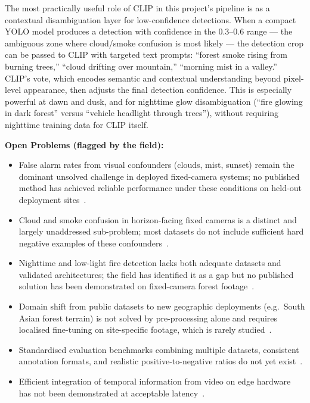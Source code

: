 \documentclass[11pt,twocolumn]{article}
\begin{document}
The most practically useful role of CLIP in this project's pipeline
is as a contextual disambiguation layer for low-confidence detections.
When a compact YOLO model produces a detection with confidence in the
0.3--0.6 range --- the ambiguous zone where cloud/smoke confusion is
most likely --- the detection crop can be passed to CLIP with targeted
text prompts: ``forest smoke rising from burning trees,''
``cloud drifting over mountain,'' ``morning mist in a valley.''
CLIP's vote, which encodes semantic and contextual understanding
beyond pixel-level appearance, then adjusts the final detection
confidence. This is especially powerful at dawn and dusk, and for
nighttime glow disambiguation (``fire glowing in dark forest'' versus
``vehicle headlight through trees''), without requiring nighttime
training data for CLIP itself.

\textbf{Open Problems (flagged by the field):}
\begin{itemize}[leftmargin=*, itemsep=2pt]
    \item False alarm rates from visual confounders (clouds, mist,
          sunset) remain the dominant unsolved challenge in deployed
          fixed-camera systems; no published method has achieved
          reliable performance under these conditions on held-out
          deployment sites~\cite{benchmarking2024, comprehensive2025}.
    \item Cloud and smoke confusion in horizon-facing fixed cameras
          is a distinct and largely unaddressed sub-problem; most
          datasets do not include sufficient hard negative examples
          of these confounders~\cite{benchmarking2024}.
    \item Nighttime and low-light fire detection lacks both adequate
          datasets and validated architectures; the field has
          identified it as a gap but no published solution has been
          demonstrated on fixed-camera forest
          footage~\cite{bouguettaya2022, datasets20years}.
    \item Domain shift from public datasets to new geographic
          deployments (e.g.\ South Asian forest terrain) is not
          solved by pre-processing alone and requires localised
          fine-tuning on site-specific footage, which is rarely
          studied~\cite{figlib2022}.
    \item Standardised evaluation benchmarks combining multiple
          datasets, consistent annotation formats, and realistic
          positive-to-negative ratios do not yet
          exist~\cite{datasets20years}.
    \item Efficient integration of temporal information from video
          on edge hardware has not been demonstrated at acceptable
          latency~\cite{figlib2022}.
\end{itemize}
\end{document}
